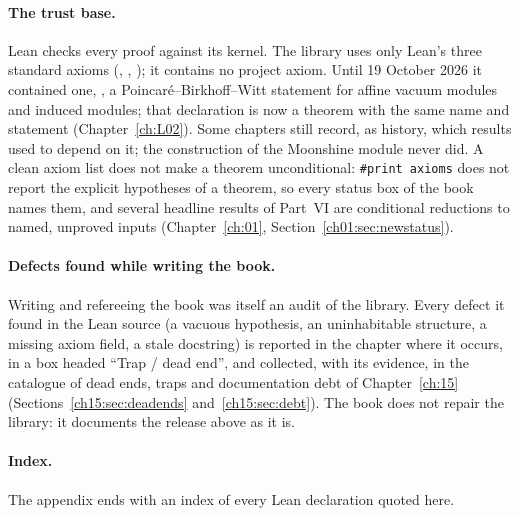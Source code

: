 \paragraph{The trust base.} Lean checks every proof against its kernel. The library uses only Lean's three
standard axioms (, , ); it contains no project axiom.
Until 19 October 2026 it contained one, , a
Poincaré--Birkhoff--Witt statement for affine vacuum modules and induced modules; that declaration is now
a theorem with the same name and statement (Chapter~\ref{ch:L02}). Some chapters still record, as history,
which results used to depend on it; the construction of the Moonshine module never did. A clean axiom list
does not make a theorem unconditional: \texttt{\#print axioms} does not report the explicit hypotheses of a
theorem, so every status box of the book names them, and several headline results of Part~VI are
conditional reductions to named, unproved inputs (Chapter~\ref{ch:01}, Section~\ref{ch01:sec:newstatus}).

\paragraph{Defects found while writing the book.} Writing and refereeing the book was itself an audit
of the library. Every defect it found in the Lean source (a vacuous hypothesis, an uninhabitable
structure, a missing axiom field, a stale docstring) is reported in the chapter where it occurs,
in a box headed ``Trap / dead end'', and collected, with its evidence, in the catalogue of dead ends,
traps and documentation debt of Chapter~\ref{ch:15} (Sections~\ref{ch15:sec:deadends} and~\ref{ch15:sec:debt}). The book does not repair the library: it documents the release above
as it is.

\paragraph{Index.} The appendix ends with an index of every Lean declaration quoted here.

